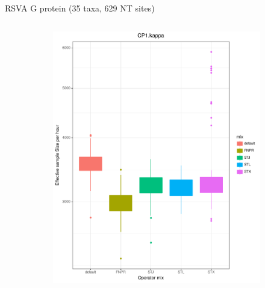 \documentclass[newPxFont,numfooter,sectionpages]{beamer}
\begin{document}
\begin{frame}{RSVA G protein (35 taxa, 629 NT sites)}
\begin{figure}
\begin{column}{0.5\textwidth}
    \begin{figure}
     \includegraphics[width=\textwidth]{figures/ESS_hour_CP1Kappa_RSVA.pdf} \\
     \end{figure}
\end{column}
\begin{column}{0.5\textwidth}  %
    \begin{figure}

\end{figure}
\end{column}
\end{figure}
\end{frame}
\end{document}
